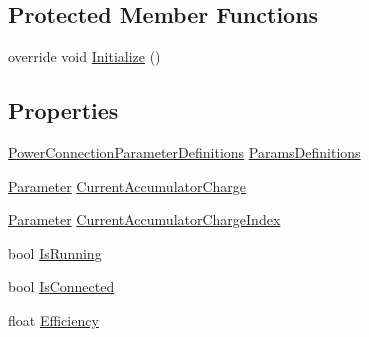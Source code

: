 \subsection*{Protected Member Functions}
\begin{DoxyCompactItemize}
\item 
override void \hyperlink{class_project_porcupine_1_1_buildable_1_1_components_1_1_power_connection_a876abd5cb8ac85a2b9b4abae9e645418}{Initialize} ()
\end{DoxyCompactItemize}
\subsection*{Properties}
\begin{DoxyCompactItemize}
\item 
\hyperlink{class_project_porcupine_1_1_buildable_1_1_components_1_1_power_connection_1_1_power_connection_parameter_definitions}{Power\+Connection\+Parameter\+Definitions} \hyperlink{class_project_porcupine_1_1_buildable_1_1_components_1_1_power_connection_abfad9b2973183a82385ae9e1212bae39}{Params\+Definitions}
\item 
\hyperlink{class_parameter}{Parameter} \hyperlink{class_project_porcupine_1_1_buildable_1_1_components_1_1_power_connection_aa8d0c0701abad9636b43d6c421df3d59}{Current\+Accumulator\+Charge}
\item 
\hyperlink{class_parameter}{Parameter} \hyperlink{class_project_porcupine_1_1_buildable_1_1_components_1_1_power_connection_accc3b910a25d44c28036a5278b31be3c}{Current\+Accumulator\+Charge\+Index}
\item 
bool \hyperlink{class_project_porcupine_1_1_buildable_1_1_components_1_1_power_connection_aa17ecc9964f460fea4477b343fc38044}{Is\+Running}
\item 
bool \hyperlink{class_project_porcupine_1_1_buildable_1_1_components_1_1_power_connection_a9ee6560d1c989b6410998e43a0a131d0}{Is\+Connected}
\item 
float \hyperlink{class_project_porcupine_1_1_buildable_1_1_components_1_1_power_connection_a1405f59ab66eab0aa40961bdf03d1b83}{Efficiency}

\end{DoxyCompactItemize}
